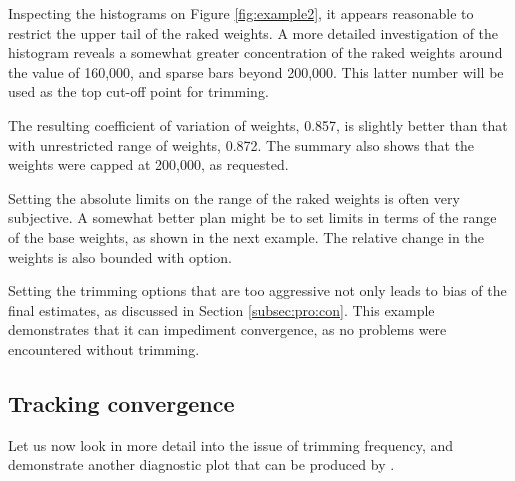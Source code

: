 \begin{stexample}[Example 3]

Inspecting the histograms on Figure \ref{fig:example2}, it appears reasonable
to restrict the upper tail of the raked weights. A more detailed investigation
of the histogram reveals a somewhat greater concentration of the raked weights
around the value of 160,000, and sparse bars beyond 200,000. This latter number
will be used as the top cut-off point for trimming.

\begin{stlog}
\nullskip
\end{stlog}

The resulting coefficient of variation of weights, 0.857, is slightly
better than that with unrestricted range of weights, 0.872. The summary also shows
that the weights were capped at 200,000, as requested.

Setting the absolute limits on the range of the raked weights is often
very subjective. A somewhat better plan might be to set limits in terms
of the range of the base weights, as shown in the next example. The relative
change in the weights is also bounded with  option.

\begin{stlog}
\nullskip
\end{stlog}

\end{stexample}

Setting the trimming options that are too aggressive not only leads
to bias of the final estimates, as discussed in Section \ref{subsec:pro:con}.
This example demonstrates that it can impediment convergence,
as no problems were encountered without trimming.

\subsection{Tracking convergence}
\label{subsec:example:trace}

Let us now look in more detail into the issue of trimming frequency,
and demonstrate another diagnostic plot that can be produced by
.

